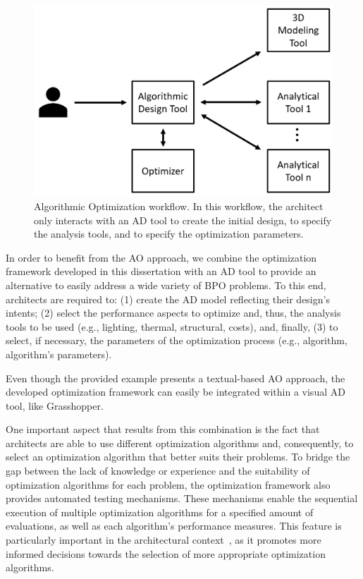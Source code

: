 \begin{figure}[htbp]
	\centering
	\includegraphics[width=\columnwidth]{../report/Images/Solution/algorithmic_optimization.png}
	\caption[Algorithmic Optimization workflow]{Algorithmic Optimization workflow. In this workflow, the architect only interacts with an \ac{AD} tool to create the initial design, to specify the analysis tools, and to specify the optimization parameters.}
	\label{fig:algorithmicoptimization}
\end{figure}

In order to benefit from the \ac{AO} approach, we combine the optimization framework developed in this dissertation with an \ac{AD} tool to provide an alternative to easily address a wide variety of \ac{BPO} problems. To this end, architects are required to: (1) create the \ac{AD} model reflecting their design's intents; (2) select the performance aspects to optimize and, thus, the analysis tools to be used (e.g., lighting, thermal, structural, costs), and, finally, (3) to select, if necessary, the parameters of the optimization process (e.g., algorithm, algorithm's parameters).


Even though the provided example presents a textual-based \ac{AO} approach, the developed optimization framework can easily be integrated within a visual \ac{AD} tool, like Grasshopper. 

One important aspect that results from this combination is the fact that architects are able to use different optimization algorithms and, consequently, to select an optimization algorithm that better suits their problems. To bridge the gap between the lack of knowledge or experience and the suitability of optimization algorithms for each problem, the optimization framework also provides automated testing mechanisms. These mechanisms enable the sequential execution of multiple optimization algorithms for a specified amount of evaluations, as well as each algorithm's performance measures. This feature is particularly important in the architectural context~\cite{Wortmann2016BBO,Hamdy2016}, as it promotes more informed decisions towards the selection of more appropriate optimization algorithms.



